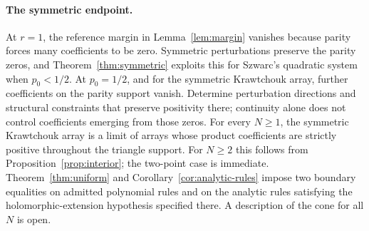 \documentclass[twoside,10pt]{article}
\numberwithin{equation}{section}
\theoremstyle{slbody}
\theoremstyle{definition}
\theoremstyle{remark}
\begin{document}
\paragraph{The symmetric endpoint.}
At $r=1$, the reference margin in Lemma~\ref{lem:margin} vanishes because parity forces many coefficients to be zero. Symmetric perturbations preserve the parity zeros, and Theorem~\ref{thm:symmetric} exploits this for Szwarc's quadratic system when $p_0<1/2$. At $p_0=1/2$, and for the symmetric Krawtchouk array, further coefficients on the parity support vanish. Determine perturbation directions and structural constraints that preserve positivity there; continuity alone does not control coefficients emerging from those zeros. For every $N\geq1$, the symmetric Krawtchouk array is a limit of arrays whose product coefficients are strictly positive throughout the triangle support. For $N\geq2$ this follows from Proposition~\ref{prop:interior}; the two-point case is immediate. Theorem~\ref{thm:uniform} and Corollary~\ref{cor:analytic-rules} impose two boundary equalities on admitted polynomial rules and on the analytic rules satisfying the holomorphic-extension hypothesis specified there. A description of the cone for all $N$ is open.
\end{document}

